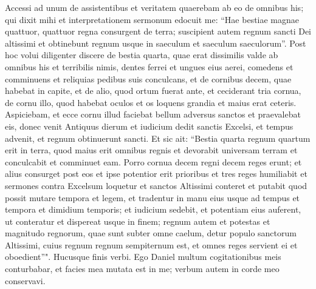 \begin{biblechapter}
\verse Accessi ad unum de assistentibus et veritatem quaerebam ab eo de omnibus his; qui dixit mihi et interpretationem sermonum edocuit me: 
\verse “Hae bestiae magnae quattuor, quattuor regna consurgent de terra; 
\verse suscipient autem regnum sancti Dei altissimi et obtinebunt regnum usque in saeculum et saeculum saeculorum”. 
\verse Post hoc volui diligenter discere de bestia quarta, quae erat dissimilis valde ab omnibus his et terribilis nimis, dentes ferrei et ungues eius aerei, comedens et comminuens et reliquias pedibus suis conculcans, 
\verse et de cornibus decem, quae habebat in capite, et de alio, quod ortum fuerat ante, et ceciderant tria cornua, de cornu illo, quod habebat oculos et os loquens grandia et maius erat ceteris. 
\verse Aspiciebam, et ecce cornu illud faciebat bellum adversus sanctos et praevalebat eis, 
\verse donec venit Antiquus dierum et iudicium dedit sanctis Excelsi, et tempus advenit, et regnum obtinuerunt sancti.  
\verse Et sic ait: “Bestia quarta regnum quartum erit in terra, quod maius erit omnibus regnis et devorabit universam terram et conculcabit et comminuet eam.  
\verse Porro cornua decem regni decem reges erunt; et alius consurget post eos et ipse potentior erit prioribus et tres reges humiliabit 
\verse et sermones contra Excelsum loquetur et sanctos Altissimi conteret et putabit quod possit mutare tempora et legem, et tradentur in manu eius usque ad tempus et tempora et dimidium temporis; 
\verse et iudicium sedebit, et potentiam eius auferent, ut conteratur et dispereat usque in finem; 
\verse regnum autem et potestas et magnitudo regnorum, quae sunt subter omne caelum, detur populo sanctorum Altissimi, cuius regnum regnum sempiternum est, et omnes reges servient ei et oboedient”". 
\verse Hucusque finis verbi. Ego Daniel multum cogitationibus meis conturbabar, et facies mea mutata est in me; verbum autem in corde meo conservavi. 
\end{biblechapter}

